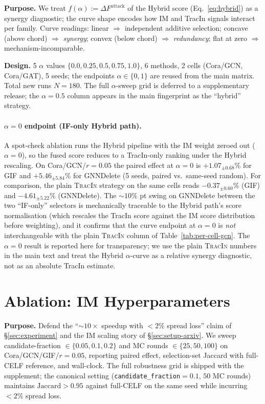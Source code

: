 \textbf{Purpose.} We treat $f(\alpha)\!:=\!\Delta F^{\text{attack}}$ of
the Hybrid score (Eq.~\ref{eq:hybrid}) as a synergy diagnostic; the
curve shape encodes how IM and TracIn signals interact per family.
Curve readings: linear $\Rightarrow$ independent additive selection;
concave (above chord) $\Rightarrow$ \emph{synergy}; convex (below
chord) $\Rightarrow$ \emph{redundancy}; flat at zero $\Rightarrow$
mechanism-incomparable.

\textbf{Design.} 5 $\alpha$ values $\{0.0, 0.25, 0.5, 0.75, 1.0\}$,
6 methods, 2 cells (Cora/GCN, Cora/GAT), 5 seeds; the endpoints
$\alpha\in\{0,1\}$ are reused from the main matrix. Total new runs
$N{=}180$. The full $\alpha$-sweep grid is deferred to a
supplementary release; the $\alpha{=}0.5$ column appears in the main
fingerprint as the ``hybrid'' strategy.

\paragraph{$\alpha{=}0$ endpoint (IF-only Hybrid path).} A
spot-check ablation runs the Hybrid pipeline with the IM weight
zeroed out ($\alpha{=}0$), so the fused score reduces to a
TracIn-only ranking under the Hybrid rescaling. On Cora/GCN/$r{=}0.05$
the paired effect at $\alpha{=}0$ is $+1.07_{\pm 0.68}\%$ for GIF and
$+5.46_{\pm 5.84}\%$ for GNNDelete (5 seeds, paired vs.\ same-seed
random). For comparison, the plain \textsc{TracIn} strategy on the
same cells reads $-0.37_{\pm 0.60}\%$ (GIF) and $-4.61_{\pm 5.22}\%$
(GNNDelete). The $\sim 10\%$ pt swing on GNNDelete between the two
``IF-only'' selectors is mechanically traceable to the Hybrid path's
score normalisation (which rescales the TracIn score against the IM
score distribution before weighting), and it confirms that the curve
endpoint at $\alpha{=}0$ is \emph{not} interchangeable with the
plain \textsc{TracIn} column of Table~\ref{tab:per-cell-gcn}. The
$\alpha{=}0$ result is reported here for transparency; we use the
plain \textsc{TracIn} numbers in the main text and treat the Hybrid
$\alpha$-curve as a relative synergy diagnostic, not as an absolute
TracIn estimate.

\section{Ablation: IM Hyperparameters}
\label{app:imhp}

\textbf{Purpose.} Defend the ``${\sim}10\times$ speedup with
$<$2\% spread loss'' claim of \S\ref{sec:experiment} and the IM
scaling story of \S\ref{sec:setup-arxiv}. We sweep candidate-fraction
$\in\{0.05,0.1,0.2\}$ and MC rounds $\in\{25,50,100\}$ on
Cora/GCN/GIF/$r{=}0.05$, reporting paired effect, selection-set
Jaccard with full-CELF reference, and wall-clock. The full robustness
grid is shipped with the supplement; the canonical setting
(\texttt{candidate\_fraction}${=}0.1$, $50$ MC rounds) maintains
$\mathrm{Jaccard}{>}0.95$ against full-CELF on the same seed while
incurring $<2\%$ spread loss.

